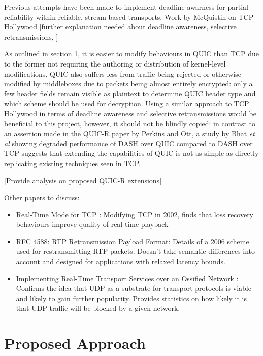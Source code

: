 \documentclass{mprop}
\begin{document}
Previous attempts have been made to implement deadline awarness for partial reliability within reliable, stream-based transports. Work by McQuistin on TCP Hollywood \cite{McQuistin2016} [further explanation needed about deadline awareness, selective retransmissions, ]

As outlined in section 1, it is easier to modify behaviours in QUIC than TCP due to the former not requiring the authoring or distribution of kernel-level modifications. QUIC also suffers less from traffic being rejected or otherwise modified by middleboxes due to packets being almost entirely encrypted: only a few header fields remain visible as plaintext to determine QUIC header type and which scheme should be used for decryption. Using a similar approach to TCP Hollywood in terms of deadline awareness and selective retransmissions would be beneficial to this project, however, it should not be blindly copied: in contrast to an assertion made in the QUIC-R paper by Perkins and Ott, a study by Bhat \textit{et al} \cite{Bhat2017} showing degraded performance of DASH over QUIC compared to DASH over TCP suggests that extending the capabilities of QUIC is not as simple as directly replicating existing techniques seen in TCP.

[Provide analysis on proposed QUIC-R extensions]

Other papers to discuss:
\begin{itemize}
  \item Real-Time Mode for TCP \cite{Liang2002}: Modifying TCP in 2002, finds that loss recovery 
  behaviours improve quality of real-time playback

  \item RFC 4588: RTP Retransmission Payload Format: Details of a 2006 scheme used for 
  restransmitting RTP packets. Doesn't take semantic differences into account and designed for 
  applications with relaxed latency bounds.

  \item Implementing Real-Time Transport Services over an Ossified Network 
  \cite {McQuistin2016Ossification}: Confirms the idea that UDP as a substrate for transport 
  protocols is viable and likely to gain further popularity. Provides statistics on how likely it 
  is that UDP traffic will be blocked by a given network.
\end{itemize}

\newpage

\section{Proposed Approach}
\end{document}
